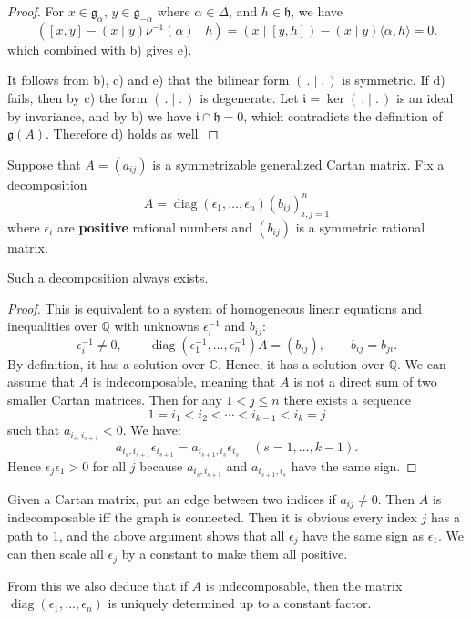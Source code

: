\documentclass[12pt]{article}
\begin{document}
\begin{proof}
    For $x \in \mathfrak{g}_\alpha$, $y \in \mathfrak{g}_{-\alpha}$ where $\alpha \in \Delta$, and $h \in \mathfrak{h}$, we have
    \[
        ([x,y] - (x \mid y)\nu^{-1}(\alpha) \mid h)
        = (x \mid [y,h]) - (x \mid y)\langle \alpha,h\rangle = 0.
    \]
    which combined with b) gives e).

    It follows from b), c) and e) that the bilinear form $(\,.\mid.\,)$ is symmetric. If d) fails, then by c) the form $(\,.\mid.\,)$ is degenerate. Let $\mathfrak{i} = \ker(\,.\mid.\,)$ is an ideal by invariance, and by b) we have $\mathfrak{i}\cap \mathfrak{h}=0$, which contradicts the definition of $\mathfrak{g}(A)$. Therefore d) holds as well.
\end{proof}

Suppose that $A = (a_{ij})$ is a symmetrizable generalized Cartan
matrix. Fix a decomposition
\[
    A = \operatorname{diag}(\epsilon_1,\dots,\epsilon_n)(b_{ij})_{i,j=1}^n
\]
where $\epsilon_i$ are \textbf{positive} rational numbers and $(b_{ij})$ is a
symmetric rational matrix.

\begin{lemma}
    Such a decomposition always exists.
\end{lemma}
\begin{proof}
    This is equivalent to a system of homogeneous linear equations
    and inequalities over $\mathbb{Q}$ with unknowns $\epsilon_i^{-1}$ and $b_{ij}$:
    \[
        \epsilon_i^{-1}\neq 0, \qquad
        \operatorname{diag}(\epsilon_1^{-1},\dots,\epsilon_n^{-1})A = (b_{ij}),
        \qquad b_{ij}=b_{ji}.
    \]
    By definition, it has a solution over $\mathbb{C}$. Hence, it has a
    solution over $\mathbb{Q}$. We can assume that $A$ is indecomposable, meaning that $A$ is not a direct sum of two smaller Cartan matrices. Then for any $1<j\leq n$ there exists a sequence
    \[
        1=i_1<i_2<\cdots<i_{k-1}<i_k=j
    \]
    such that $a_{i_s,i_{s+1}}<0$. We have:
    \[
        a_{i_s,i_{s+1}}\epsilon_{i_{s+1}}
        = a_{i_{s+1},i_s}\epsilon_{i_s}\quad (s=1,\dots,k-1).
    \]
    Hence $\epsilon_j\epsilon_1>0$ for all $j$ because $a_{i_s,i_{s+1}}$ and $a_{i_{s+1},i_s}$ have the same sign.
\end{proof}

\begin{remark}
     Given a Cartan matrix, put an edge between two indices if $a_{ij}\neq 0$. Then $A$ is indecomposable iff the graph is connected. Then it is obvious every index $j$ has a path to $1$, and the above argument shows that all $\epsilon_j$ have the same sign as $\epsilon_1$. We can then scale all $\epsilon_j$ by a constant to make them all positive.
\end{remark}
From this we also deduce that if $A$ is indecomposable, then the matrix $\operatorname{diag}(\epsilon_1,\dots,\epsilon_n)$ is uniquely determined up to a constant factor.
\end{document}

